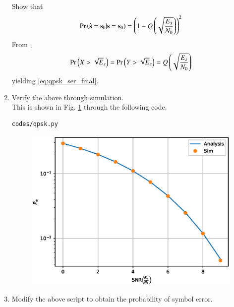\documentclass[journal,12pt,twocolumn]{IEEEtran}
\renewcommand\thesection{\arabic{section}}
\begin{document}
\begin{enumerate}[label=\arabic*.,ref=\thesection.\theenumi]
Show that 
\begin{equation}
\Pr\left(\hat{\mathbf{s}} = \mathbf{s}_0|\mathbf{s} = \mathbf{s}_0\right) 
 = \left(1-Q\left(\sqrt{\frac{E_s}{N_0}}\right)\right)^2
\label{eq:qpsk_ser_final}
\end{equation}
\solution From \label{prob:qpsk_xy}, 
\begin{align}
\Pr\left(X > \sqrt{E}_s\right) = \Pr\left(Y > \sqrt{E}_s\right) = Q\left(\sqrt{\frac{E_s}{N_0}}\right)
\end{align}
yielding \eqref{eq:qpsk_ser_final}.

\item

Verify the above through simulation.
\\
\solution 
This is shown in Fig. \ref{fig:qpsk} through the following code.
\begin{lstlisting}
codes/qpsk.py
\end{lstlisting}
%
\begin{figure}[!h]
\centering
\includegraphics[width=\columnwidth]{./figs/qpsk.eps}
\caption{}
\label{fig:qpsk}
\end{figure}

\item
Modify the above script to obtain the probability of symbol error.


\end{enumerate}
\end{document}
